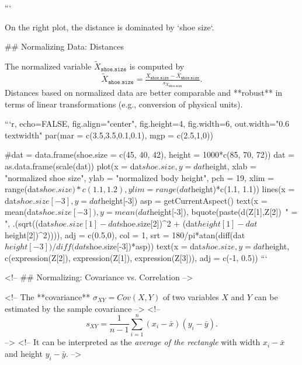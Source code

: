 ```

On the right plot, the distance is dominated by `shoe size`.

## Normalizing Data: Distances

\small
The normalized variable $\tilde{X}_{\texttt{shoe.size}}$ is computed by
\[\tilde{X}_{\texttt{shoe.size}} = \tfrac{X_{\texttt{shoe.size}}-\bar{X}_{\texttt{shoe.size}}}{s_{X_{\texttt{shoe.size}}}}.\]
Distances based on normalized data are better comparable and **robust** in terms of linear transformations (e.g., conversion of physical units).

```{r, echo=FALSE, fig.align="center", fig.height=4, fig.width=6, out.width="0.6\\textwidth"}
par(mar = c(3.5,3.5,0.1,0.1), mgp = c(2.5,1,0))

#dat = data.frame(shoe.size = c(45, 40, 42), height = 1000*c(85, 70, 72))
dat = as.data.frame(scale(dat))
plot(x = dat$shoe.size, y = dat$height, xlab = "normalized shoe size", ylab = "normalized body height",
  pch = 19, xlim = range(dat$shoe.size)*c(1.1, 1.2), ylim = range(dat$height)*c(1.1, 1.1))
lines(x = dat$shoe.size[-3], y = dat$height[-3])
asp = getCurrentAspect()
text(x = mean(dat$shoe.size[-3]), y = mean(dat$height[-3]),
  bquote(paste(d(Z[1],Z[2])~" = ", .(sqrt((dat$shoe.size[1]-dat$shoe.size[2])^2 + (dat$height[1]-dat$height[2])^2)))),
  adj = c(0.5,0), col = 1, srt = 180/pi*atan(diff(dat$height[-3])/diff(dat$shoe.size[-3])*asp))
text(x = dat$shoe.size, y = dat$height, c(expression(Z[2]), expression(Z[1]), expression(Z[3])), adj = c(-1, 0.5))
```

<!-- ## Normalizing: Covariance vs. Correlation -->

<!-- The **covariance** $\sigma_{XY} = Cov(X,Y)$ of two variables $X$ and $Y$ can be estimated by the sample covariance -->
<!-- $$s_{XY}=\dfrac{1}{n-1}\sum_{i=1}^{n}{(x_i-\bar{x})(y_i-\bar{y})}.$$ -->
<!-- It can be interpreted as the \emph{average of the rectangle} with width $x_i - \bar{x}$ and height $y_i - \bar{y}$. -->

